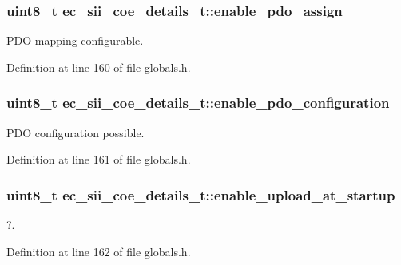 \subsubsection[{enable\-\_\-pdo\-\_\-assign}]{\setlength{\rightskip}{0pt plus 5cm}uint8\-\_\-t {\bf ec\-\_\-sii\-\_\-coe\-\_\-details\-\_\-t\-::enable\-\_\-pdo\-\_\-assign}}\label{structec__sii__coe__details__t_a30ce481a3965c5bc1737918e3cbe6d63}


\-P\-D\-O mapping configurable. 



\-Definition at line 160 of file globals.\-h.

\subsubsection[{enable\-\_\-pdo\-\_\-configuration}]{\setlength{\rightskip}{0pt plus 5cm}uint8\-\_\-t {\bf ec\-\_\-sii\-\_\-coe\-\_\-details\-\_\-t\-::enable\-\_\-pdo\-\_\-configuration}}\label{structec__sii__coe__details__t_acefe917c36bc9c0fc0ff931fcbabc211}


\-P\-D\-O configuration possible. 



\-Definition at line 161 of file globals.\-h.

\subsubsection[{enable\-\_\-upload\-\_\-at\-\_\-startup}]{\setlength{\rightskip}{0pt plus 5cm}uint8\-\_\-t {\bf ec\-\_\-sii\-\_\-coe\-\_\-details\-\_\-t\-::enable\-\_\-upload\-\_\-at\-\_\-startup}}\label{structec__sii__coe__details__t_a1bb6f479bf46b3113a181478f8b1fbef}


?. 



\-Definition at line 162 of file globals.\-h.

